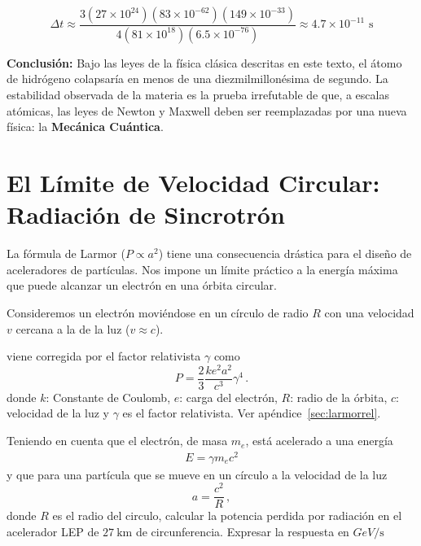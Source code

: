 \documentclass[11pt,a4paper]{book}
\begin{document}
\begin{equation}
    \Delta t \approx \frac{3 (27 \times 10^{24}) (83 \times 10^{-62}) (149 \times 10^{-33})}{4 (81 \times 10^{18}) (6.5 \times 10^{-76})} \approx 4.7 \times 10^{-11} \text{ s}
\end{equation}

\textbf{Conclusión:}
Bajo las leyes de la física clásica descritas en este texto, el átomo de hidrógeno colapsaría en menos de una diezmilmillonésima de segundo. La estabilidad observada de la materia es la prueba irrefutable de que, a escalas atómicas, las leyes de Newton y Maxwell deben ser reemplazadas por una nueva física: la \textbf{Mecánica Cuántica}.

\section{El Límite de Velocidad Circular: Radiación de Sincrotrón}

La fórmula de Larmor ($P \propto a^2$) tiene una consecuencia drástica para el diseño de aceleradores de partículas. Nos impone un límite práctico a la energía máxima que puede alcanzar un electrón en una órbita circular.

Consideremos un electrón moviéndose en un círculo de radio $R$ con una velocidad $v$ cercana a la de la luz ($v \approx c$).

viene corregida por el factor relativista $\gamma$ como
\begin{equation}    
    P = \frac{2}{3} \frac{k e^2 a^2}{c^3}\gamma^4\,.
    \label{eq:larmor}
\end{equation}
donde $k$: Constante de Coulomb, $e$: carga del electrón, $R$: radio de la órbita, $c$: velocidad de la luz y $\gamma$ es el factor relativista. Ver apéndice~\ref{sec:larmorrel}.

Teniendo en cuenta que el electrón, de masa $m_e$, está acelerado a una energía
\begin{align}
    E = \gamma m_e c^2
\end{align}
y que para una partícula que se mueve en un círculo a la velocidad de la luz 
\begin{equation}
 a = \frac{c^2}{R}\,,   
\end{equation}
donde $R$ es el radio del circulo, calcular la potencia perdida por radiación en el acelerador LEP de $\qty{27}{\kilo\meter}$ de circunferencia. Expresar la respuesta en $\unit{GeV}/\unit{\second}$
\end{document}
